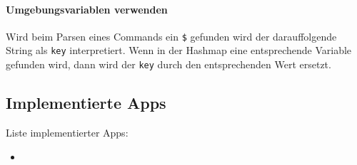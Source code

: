         \paragraph{Umgebungsvariablen verwenden}
            Wird beim Parsen eines Commands ein \verb|$| gefunden wird der darauffolgende String als \verb|key| interpretiert. Wenn in der Hashmap eine entsprechende Variable gefunden wird, dann wird der \verb|key| durch den entsprechenden Wert ersetzt.

\subsection{Implementierte Apps}
    Liste implementierter Apps:
    \begin{itemize}
        \item 
    \end{itemize}